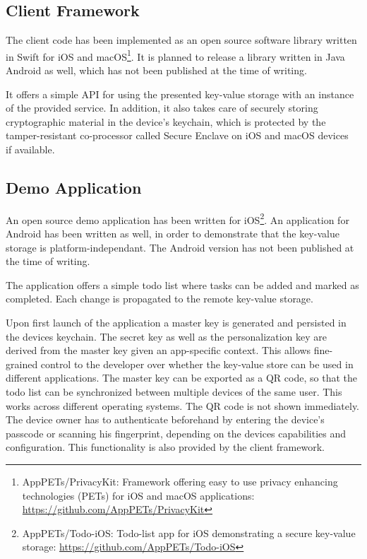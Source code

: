 \subsection{Client Framework}
The client code has been implemented as an open source software library written in Swift for iOS and macOS\footnote{AppPETs/PrivacyKit: Framework offering easy to use privacy enhancing technologies (PETs) for iOS and macOS applications: \url{https://github.com/AppPETs/PrivacyKit}}.
It is planned to release a library written in Java Android as well, which has not been published at the time of writing.

It offers a simple API for using the presented key-value storage with an instance of the provided service.
In addition, it also takes care of securely storing cryptographic material in the device's keychain, which is protected by the tamper-resistant co-processor called Secure Enclave on iOS and macOS devices~\cite{ios-security-2018-08} if available.

\subsection{Demo Application}
An open source demo application has been written for iOS\footnote{AppPETs/Todo-iOS: Todo-list app for iOS demonstrating a secure key-value storage: \url{https://github.com/AppPETs/Todo-iOS}}.
An application for Android has been written as well, in order to demonstrate that the key-value storage is platform-independant.
The Android version has not been published at the time of writing.

The application offers a simple todo list where tasks can be added and marked as completed.
Each change is propagated to the remote key-value storage.

Upon first launch of the application a master key is generated and persisted in the devices keychain.
The secret key as well as the personalization key are derived from the master key given an app-specific context.
This allows fine-grained control to the developer over whether the key-value store can be used in different applications.
The master key can be exported as a QR code, so that the todo list can be synchronized between multiple devices of the same user.
This works across different operating systems.
The QR code is not shown immediately.
The device owner has to authenticate beforehand by entering the device's passcode or scanning his fingerprint, depending on the devices capabilities and configuration.
This functionality is also provided by the client framework.

